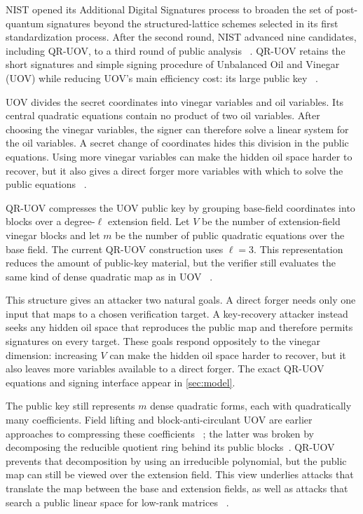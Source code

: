 \documentclass[11pt,a4paper]{article}
\theoremstyle{definition}
\theoremstyle{remark}
\newcommand{\QRUOV}{\textsf{QR-UOV}}
\begin{document}
NIST opened its Additional Digital Signatures process to broaden the set of
post-quantum signatures beyond the structured-lattice schemes selected in its
first standardization process.  After the second round, NIST advanced nine
candidates, including \QRUOV{}, to a third round of public analysis
~\cite{NISTRound3,NISTIR8610}.  \QRUOV{} retains the short signatures and
simple signing procedure of Unbalanced Oil and Vinegar (UOV) while reducing
UOV's main efficiency cost: its large public key
~\cite{QRUOVOriginal,QRUOVSpec}.

UOV divides the secret coordinates into vinegar variables and oil variables.
Its central quadratic equations contain no product of two oil variables.
After choosing the vinegar variables, the signer can therefore solve a linear
system for the oil variables.  A secret change of coordinates hides this
division in the public equations.  Using more vinegar variables can make the
hidden oil space harder to recover, but it also gives a direct forger more
variables with which to solve the public equations
~\cite{KPG1999,KipnisShamir1998,BraekenWolfPreneel2005}.

\QRUOV{} compresses the UOV public key by grouping base-field coordinates into
blocks over a degree-$\ell$ extension field.  Let $V$ be the number of
extension-field vinegar blocks and let $m$ be the number of public quadratic
equations over the base field.  The current QR-UOV construction uses
$\ell=3$.  This representation reduces the amount of public-key material, but
the verifier still evaluates the same kind of dense quadratic map as in UOV
~\cite{QRUOVOriginal,QRUOVSpec}.

This structure gives an attacker two natural goals.  A direct forger needs
only one input that maps to a chosen verification target.  A key-recovery
attacker instead seeks any hidden oil space that reproduces the public map and
therefore permits signatures on every target.  These goals respond oppositely
to the vinegar dimension: increasing $V$ can make the hidden oil space harder
to recover, but it also leaves more variables available to a direct forger.
The exact QR-UOV equations and signing interface appear in \cref{sec:model}.

The public key still represents $m$ dense quadratic forms, each with
quadratically many coefficients.  Field lifting and block-anti-circulant UOV
are earlier approaches to compressing these coefficients
~\cite{FieldLifting,BACUOV}; the latter was broken by decomposing the reducible
quotient ring behind its public blocks~\cite{BACUOVAttack}.  \QRUOV{} prevents
that decomposition by using an irreducible polynomial, but the public map can
still be viewed over the extension field.  This view underlies attacks that
translate the map between the base and extension fields, as well as attacks
that search a public linear space for low-rank matrices
~\cite{QRUOVOriginal,FurueIkematsu}.
\end{document}
